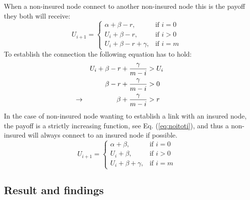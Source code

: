 When a non-insured node connect to another non-insured node this is the payoff they both will receive:
\begin{equation}
    U_{i+1}= 
\begin{cases}
    \alpha + \beta -r,& \text{if } i = 0\\
    U_{i}+\beta -r,& \text{if }  i>0\\
    U_{i}+\beta -r +\gamma,& \text{if } i=m
\end{cases}
\label{eq:noitonoti}
\end{equation}
To establish the connection the following equation has to hold:
\begin{eqnarray}
U_{i}+\beta-r+\frac{\gamma}{m-i}&>U_{i} \nonumber \\ 
\beta-r+\frac{\gamma}{m-i}&>0 \nonumber \\ 
\llap{$\rightarrow$\hspace{50pt}} \beta+\frac{\gamma}{m-i}&>r
\end{eqnarray}
In the case of non-insured node wanting to establish a link with an insured node, the payoff is a strictly increasing function, see Eq. (\ref{eq:noitoti}), and thus a non-insured will always connect to an insured node if possible.
\begin{equation}
    U_{i+1}= 
\begin{cases}
    \alpha + \beta,& \text{if } i = 0\\
    U_{i}+\beta,& \text{if }  i>0\\
    U_{i}+\beta +\gamma,& \text{if } i=m
\end{cases}
\label{eq:noitoti}
\end{equation}

\subsection{Result and findings}

